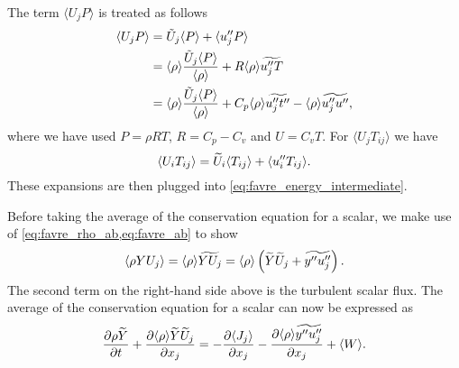 \documentclass[oneside,a4paper,11pt]{report}
\begin{document}
The term $ \langle U_j P \rangle $ is treated as follows
\begin{align}
\langle U_j P \rangle &= \tilde{U}_j \langle P \rangle  + \langle u''_j P \rangle \nonumber \\ 
&= \langle \rho \rangle \frac { \tilde{U}_j \langle P \rangle}{\langle \rho \rangle} + R \langle \rho \rangle \widetilde{ u''_j T } \nonumber \\
&= \langle \rho \rangle \frac{ \tilde{U}_j \langle P \rangle }{\langle \rho \rangle} + C_p \langle \rho \rangle \widetilde{ u''_j t'' } - \langle \rho \rangle \widetilde{ u''_j u'' } \label{eq:puj_expansion} ,
\end{align}
where we have used $P = \rho R T$, $R = C_p - C_v$ and $U = C_v T$. For $\langle U_j T_{ij} \rangle $ we have
\begin{equation}
\label{eq:tuj_expansion}
\langle U_i T_{ij} \rangle = \widetilde{U}_i \langle T_{ij} \rangle + \langle u_i'' T_{ij} \rangle. 
\end{equation}
These expansions are then plugged into \cref{eq:favre_energy_intermediate}. 

Before taking the average of the conservation equation for a scalar, we make use of \cref{eq:favre_rho_ab,eq:favre_ab} to show
\begin{equation}
\label{eq:scalar_flux_expansion}
    \left < \rho Y U_j \right > = \langle \rho \rangle \widetilde{Y U_j} = \langle \rho \rangle \left ( \widetilde{Y} \widetilde{U}_j + \widetilde{y'' u_j''} \right).
\end{equation}
The second term on the right-hand side above is the turbulent scalar flux. The average of the conservation equation for a scalar can now be expressed as
\begin{equation}
    \frac{\partial \rho \widetilde{Y}}{\partial t} + \frac{\partial \langle \rho \rangle \widetilde{Y} \widetilde{U}_j}{\partial x_j} = -\frac{\partial \langle J_j \rangle}{\partial x_j} - \frac{\partial \langle \rho \rangle \widetilde{y'' u_j''}}{\partial x_j} + \langle W \rangle.
\end{equation}
\end{document}

